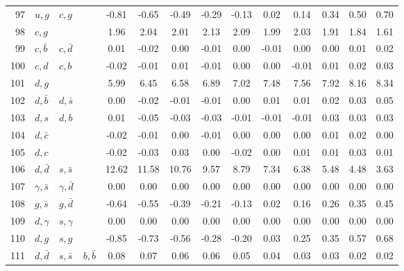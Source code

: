 \begin{tabularx}{\textwidth}{rXXX@{}S@{}S@{}S@{}S@{}S@{}S@{}S@{}S@{}S@{}S}
 97 & $u, g$           & $c, g$            &                  & -0.81 & -0.65 & -0.49 & -0.29 & -0.13 &  0.02 &  0.14 &  0.34 &  0.50 &  0.70 \\
 98 & $c, g$           &                   &                  &  1.96 &  2.04 &  2.01 &  2.13 &  2.09 &  1.99 &  2.03 &  1.91 &  1.84 &  1.61 \\
 99 & $c, \bar b$      & $c, \bar d$       &                  &  0.01 & -0.02 &  0.00 & -0.01 &  0.00 & -0.01 &  0.00 &  0.00 &  0.01 &  0.02 \\
100 & $c, d$           & $c, b$            &                  & -0.02 & -0.01 &  0.01 & -0.01 &  0.00 &  0.00 & -0.01 &  0.01 &  0.02 &  0.03 \\
101 & $d, g$           &                   &                  &  5.99 &  6.45 &  6.58 &  6.89 &  7.02 &  7.48 &  7.56 &  7.92 &  8.16 &  8.34 \\
102 & $d, \bar b$      & $d, \bar s$       &                  &  0.00 & -0.02 & -0.01 & -0.01 &  0.00 &  0.01 &  0.01 &  0.02 &  0.03 &  0.05 \\
103 & $d, s$           & $d, b$            &                  &  0.01 & -0.05 & -0.03 & -0.03 & -0.01 & -0.01 & -0.01 &  0.03 &  0.03 &  0.03 \\
104 & $d, \bar c$      &                   &                  & -0.02 & -0.01 &  0.00 & -0.01 &  0.00 &  0.00 &  0.00 &  0.01 &  0.02 &  0.00 \\
105 & $d, c$           &                   &                  & -0.02 & -0.03 &  0.03 &  0.00 & -0.02 &  0.00 &  0.01 &  0.01 &  0.03 &  0.01 \\
106 & $d, \bar d$      & $s, \bar s$       &                  & 12.62 & 11.58 & 10.76 &  9.57 &  8.79 &  7.34 &  6.38 &  5.48 &  4.48 &  3.63 \\
107 & $\gamma, \bar s$ & $\gamma, \bar d$  &                  &  0.00 &  0.00 &  0.00 &  0.00 &  0.00 &  0.00 &  0.00 &  0.00 &  0.00 &  0.00 \\
108 & $g, \bar s$      & $g, \bar d$       &                  & -0.64 & -0.55 & -0.39 & -0.21 & -0.13 &  0.02 &  0.16 &  0.26 &  0.35 &  0.45 \\
109 & $d, \gamma$      & $s, \gamma$       &                  &  0.00 &  0.00 &  0.00 &  0.00 &  0.00 &  0.00 &  0.00 &  0.00 &  0.00 &  0.00 \\
110 & $d, g$           & $s, g$            &                  & -0.85 & -0.73 & -0.56 & -0.28 & -0.20 &  0.03 &  0.25 &  0.35 &  0.57 &  0.68 \\
111 & $d, \bar d$      & $s, \bar s$       & $b, \bar b$      &  0.08 &  0.07 &  0.06 &  0.06 &  0.05 &  0.04 &  0.03 &  0.03 &  0.02 &  0.02 \\

\end{tabularx}
